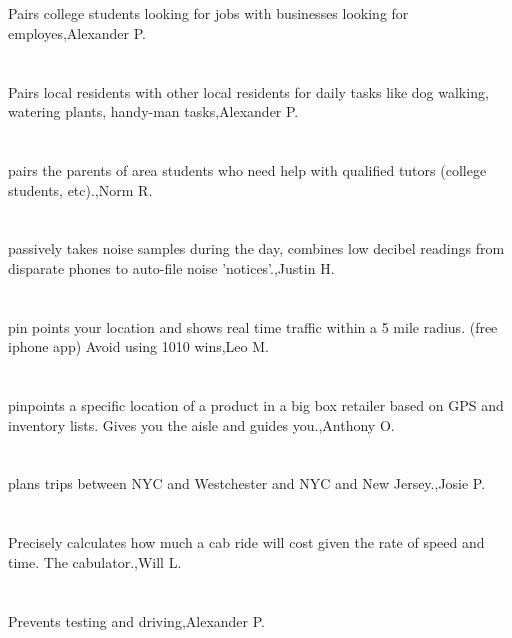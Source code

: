 \section{}Pairs college students looking for jobs with businesses looking for employes,Alexander P.	
\section{}Pairs local residents with other local residents for daily tasks like dog walking, watering plants, handy-man tasks,Alexander P.	
\section{}pairs the parents of area students who need help with qualified tutors (college students, etc).,Norm R.	
\section{}passively takes noise samples during the day, combines low decibel readings from disparate phones to auto-file noise 'notices'.,Justin H.	
\section{} pin points your location and shows real time traffic within a 5 mile radius.  (free iphone app) Avoid using 1010 wins,Leo M.	
\section{}pinpoints a specific location of a product in a big box retailer based on GPS and inventory lists.  Gives you the aisle and guides you.,Anthony O.	
\section{} plans trips between NYC and Westchester and NYC and New Jersey.,Josie P.	
\section{}Precisely calculates how much a cab ride will cost given the rate of speed and time. The cabulator.,Will L.	
\section{}Prevents testing and driving,Alexander P.	
